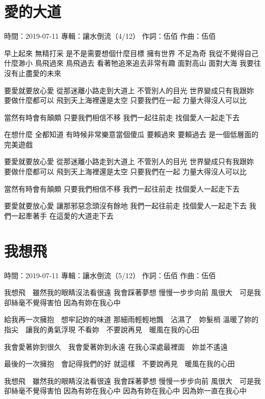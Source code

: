 \documentclass[UTF8,a4paper,oneside,twocolumn,12pt]{ctexbook}
\newcommand{\infopair}[2]{\textbullet #1：#2}
\newcommand{\zc}[1][伍佰]{\infopair{作詞}{#1}}
\newcommand{\zq}[1][伍佰]{\infopair{作曲}{#1}}
\newcommand{\zj}[1]{\infopair{專輯}{#1}}
\newcommand{\sj}[1]{\infopair{時間}{#1}}
\newenvironment{info}{\begin{flushleft}\kaishu
	}
	{\end{flushleft}\normalsize\yahei\par}
\newenvironment{lyric}{
	}
{}
\begin{document}
\section{愛的大道}
\begin{info}
	\sj{2019-07-11}
	\zj{讓水倒流（4/12）}
	\zc
	\zq
\end{info}
\begin{lyric}
	早上起來 無精打采
	是不是需要想個什麼目標
	擁有世界 不足為奇
	我從不覺得自己什麼渺小
	鳥飛過來 鳥飛過去
	看著牠追來追去非常有趣
	面對高山 面對大海
	我要往沒有止盡愛的未來

	要愛就要放心愛
	從那迷離小路走到大道上
	不管別人的目光
	世界變成只有我跟妳
	要做什麼都可以
	飛到天上海裡還是太空
	只要我們在一起
	力量大得沒人可以比

	當然有時會有顛頗
	只要我們相信不移
	我們一起往前走
	找個愛人一起走下去

	在想什麼 全都知道
	有時候非常樂意當個傻瓜
	要賴過來 要賴過去
	是一個低層面的完美遊戲

	要愛就要放心愛
	從那迷離小路走到大道上
	不管別人的目光
	世界變成只有我跟妳
	要做什麼都可以
	飛到天上海裡還是太空
	只要我們在一起
	力量大得沒人可以比

	當然有時會有顛頗
	只要我們相信不移
	我們一起往前走
	找個愛人一起走下去

	要愛就要放心愛
	讓那邪惡念頭沒有餘地
	我們一起往前走
	找個愛人一起走下去
	我們一起牽著手
	在這愛的大道走下去
\end{lyric}

\section{我想飛}
\begin{info}
	\sj{2019-07-11}
	\zj{讓水倒流（5/12）}
	\zc
	\zq
\end{info}
\begin{lyric}
	我想飛　雖然我的眼睛沒法看很遠
	我會踩著夢想
	慢慢一步步向前
	風很大　可是我卻絲毫不覺得害怕
	因為有妳在我心中

	給我再一次擁抱　想牢記妳的味道
	那細雨輕輕地飄　沾濕了　妳髮梢
	溫暖了妳的指尖　讓我的勇氣浮現
	不看妳　不要說再見　暖風在我的心田

	我會愛著妳到很久　我會愛著妳到永遠
	在我心深處最裡面　妳並不遙遠

	最後的一次擁抱　會記得我們的好
	就這樣　不要說再見　暖風在我的心田

	我想飛　雖然我的眼睛沒法看很遠
	我會踩著夢想
	慢慢一步步向前
	風很大　可是我卻絲毫不覺得害怕
	因為有妳在我心中
	因為有妳在我心中
	因為妳一直在我心中
\end{lyric}
\end{document}
